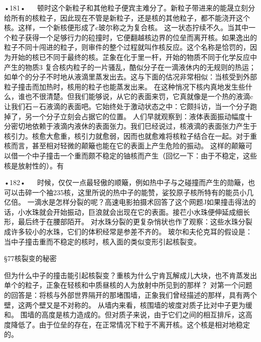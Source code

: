 •181•
  
顿时这个新粒子和其他粒子便宾主难分了。新粒子带进来的能晟立刻分给所有的核粒子，因此现在不管是新粒子，还是核的其他粒子，都不能浇开这个核。这样，一个新核便形成了c玻尔称之为复合核。
这一状态拧续不久。当其中一个粒子获得一个足够行力的砬撞时，它便翻越核边界的位垒而离开核。如果逸出的粒子不同十闯进的粒子，则审件的整个过程就叫作核反应。这个名称是恰罚的，因为开始的核已不同于最终的核。芷象在化于里一杆，开始的物质不同于化学反应中产生的物质3
复合核内粒子的一片骚乱，酷似分子在一滴液休内的无规则的热运；如单个的分子不时地从液滴里蒸发出去。这与下面的估况非常相似：当核受到外部粒子撞击而加热时，核用的粒子也能蒸发出来。
在这种悄况下核内真地发生些什么，谁也不很清楚。但我们能够说，从它的表面来罚，它真就像是一个热的液滴c让我们石－石液滴的表面吧。它始终处于激动状态之中：它颇抖访，当一个分子跑掉了，另一个分子立刻会占据它的位置。
人们早就观察到：液体表面振动幅度十分密切地依赖于液滴内液休的表面张力。我们巳经说过，核液滴的表面张力产生于核引力。核愈大愈重，核引力就愈弱，因而也就愈难将核粒子结合在一起。对于重核而言，甚至相对轻微的颠簸也能在它的表面上产生危险的振动。
这样的颠簸可以借一个中子撞击一个重而颇不稳定的铀核而产生（回忆一下：由于不稳定，这些核是放射性的）。有

•182•
  
时候，仅仅一点最轻傲的顺簸，例如热中子与之碰撞而产生的勋簸，也可以击碎一个袖235核，这里所说的热中子的能赞，娑狡原子核所特有的能员小几亿倍。
一滴水是怎样分裂的呢？高速电影拍摄术回答了这个网题J如果撞击得法的话，小水珠就会开始振动，巨浪就会出现在它的表面。接芢小水珠便伸延成细长形，最后终于在腰部陌开。
对水珠分裂的更复杂悄状也作了观察：这些水珠分裂成许多较小的水珠，它们的体积经常是参差不齐的。
玻尔和夫伦克耳的假设是：当中子撞击重而不稳定的核时，核入面的类似变形引起核裂变。

§77核裂变的秘密

但为什么中子的撞击能引起核裂变？重核为什么宁肯瓦解成儿大块，也不肯蒸发出单个的粒子，正象在轻核和中质昼核的人为放射中所见到的那样？
对第一个问题的回答是：将核与外部世界隔开的那堵围墙，正象我们曾经描述的那样，具有两个壁，这两个壁又是不对称的。
从墙内来看，核围墙的坡度对质子比对中子更为缓和。
围墙的高度是核力造成的。但对质子来说，由于它们之间的相互排斥，这高度降低了。由于位垒的存在，在正常情况下粒于不离开核。这个核是相对地稳定的。

